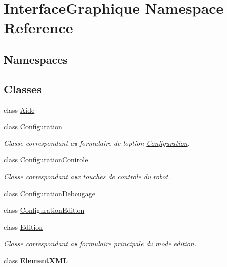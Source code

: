 \hypertarget{namespace_interface_graphique}{}\section{Interface\+Graphique Namespace Reference}
\label{namespace_interface_graphique}
\subsection*{Namespaces}
\begin{DoxyCompactItemize}
\end{DoxyCompactItemize}
\subsection*{Classes}
\begin{DoxyCompactItemize}
\item 
class \hyperlink{class_interface_graphique_1_1_aide}{Aide}
\item 
class \hyperlink{class_interface_graphique_1_1_configuration}{Configuration}
\begin{DoxyCompactList}\small\item\em Classe correspondant au formulaire de l\textquotesingle{}option \hyperlink{class_interface_graphique_1_1_configuration}{Configuration}. \end{DoxyCompactList}\item 
class \hyperlink{class_interface_graphique_1_1_configuration_controle}{Configuration\+Controle}
\begin{DoxyCompactList}\small\item\em Classe correspondant aux touches de controle du robot. \end{DoxyCompactList}\item 
class \hyperlink{class_interface_graphique_1_1_configuration_debougage}{Configuration\+Debougage}
\item 
class \hyperlink{class_interface_graphique_1_1_configuration_edition}{Configuration\+Edition}
\item 
class \hyperlink{class_interface_graphique_1_1_edition}{Edition}
\begin{DoxyCompactList}\small\item\em Classe correspondant au formulaire principale du mode edition. \end{DoxyCompactList}\item 
class {\bfseries Element\+X\+ML}
\item 

\end{DoxyCompactItemize}
